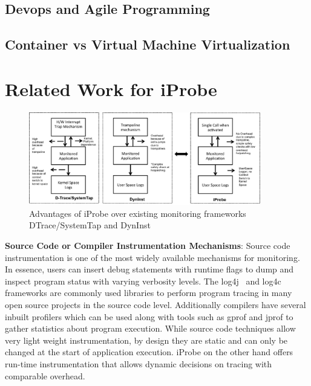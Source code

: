 \subsection{Devops and Agile Programming}

\subsection{Container vs Virtual Machine Virtualization}

\section{Related Work for iProbe}



\begin{figure}[ht]
	\begin{center}
		\includegraphics[width=0.9\textwidth]{iprobe/Images/related.eps}
		\caption{Advantages of iProbe over existing monitoring frameworks DTrace/SystemTap and DynInst}
		\label{fig:related}
	\end{center}
\end{figure}

\noindent \textbf{Source Code or Compiler Instrumentation Mechanisms}: \quad
Source code instrumentation is one of the most widely available mechanisms for monitoring. 
In essence, users can insert debug statements with runtime flags to dump and inspect program status with varying verbosity levels. 
The log4j~\cite{log4j} and log4c~\cite{log4c} frameworks are commonly used libraries to perform program tracing in many open source projects in the source code level. 
Additionally compilers have several inbuilt profilers which can be used along with tools such as gprof and jprof to gather statistics about program execution.
While source code techniques allow very light weight instrumentation, by design they are static and can only be changed at the start of application execution. 
iProbe on the other hand offers run-time instrumentation that allows dynamic decisions on tracing with comparable overhead.


